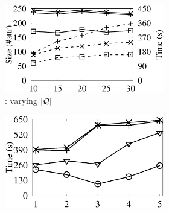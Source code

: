 \begin{figure}[tb!]
  \vspace*{-1.7ex}
  \begin{subfigure}[b]{1.00\textwidth}
    \setlength{\fboxrule}{0.1pt}
    \vspace{0.5ex}
  \end{subfigure} 
\begin{subfigure}[b]{1.00\textwidth}
  \centering
        \begin{subfigure}[b]{0.271\textwidth}
			\centering
			\includegraphics[width=1\textwidth]{fig/vary_q_tpch.eps}
			\begin{center}
				\vspace{-2ex}\caption{\tpch: varying $|\mathcal Q|$}
				\label{tpch-1-varyQ} 
			\end{center}
			\vspace{-1ex}
        \end{subfigure}
        \hspace{-3ex}
        \begin{subfigure}[b]{0.256\textwidth}
          \centering
          \includegraphics[width=1\textwidth]{fig/vary_j_tpch.eps}

\end{subfigure}
\end{subfigure}
\end{figure}
